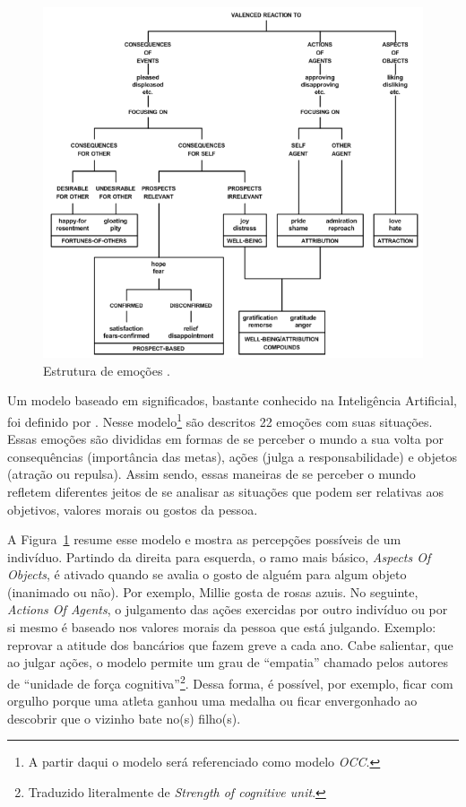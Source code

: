 \begin{figure}[t]
  \centering
    \includegraphics[width=150mm]{figuras/occ.png}
  \caption{Estrutura de emoções \cite{ortony1988cse}.}
  \label{fig:occ_model}
\end{figure}

Um modelo baseado em significados, bastante conhecido na Inteligência
Artificial, foi definido por \citet{ortony1988cse}. Nesse modelo\footnote{A
partir daqui o modelo será referenciado como modelo \emph{OCC}.} são descritos
22 emoções com suas situações. Essas emoções são divididas em formas de se
perceber o mundo a sua volta por consequências (importância das metas),
ações (julga a responsabilidade) e objetos (atração ou repulsa). Assim sendo,
essas maneiras de se perceber o mundo refletem diferentes jeitos de se
analisar as situações que podem ser relativas aos objetivos, valores morais ou
gostos da pessoa.

A Figura~\ref{fig:occ_model} resume esse modelo e mostra as
percepções possíveis de um indivíduo.  Partindo da direita para esquerda, o
ramo mais básico, \emph{Aspects Of Objects}, é ativado quando se avalia o
gosto de alguém para algum objeto (inanimado ou não). Por exemplo, Millie
gosta de rosas azuis. No seguinte, \emph{Actions Of Agents}, o julgamento das
ações exercidas por outro indivíduo ou por si mesmo é baseado nos
valores morais da pessoa que está julgando. Exemplo: reprovar a atitude dos
bancários que fazem greve a cada ano. Cabe salientar, que ao julgar ações, o
modelo permite um grau de ``empatia'' chamado pelos autores de ``unidade de
força cognitiva''\footnote{Traduzido literalmente de \emph{Strength of
cognitive unit}.}. Dessa forma, é possível, por exemplo, ficar com orgulho
porque uma atleta ganhou uma medalha ou ficar envergonhado ao descobrir que o
vizinho bate no(s) filho(s).

